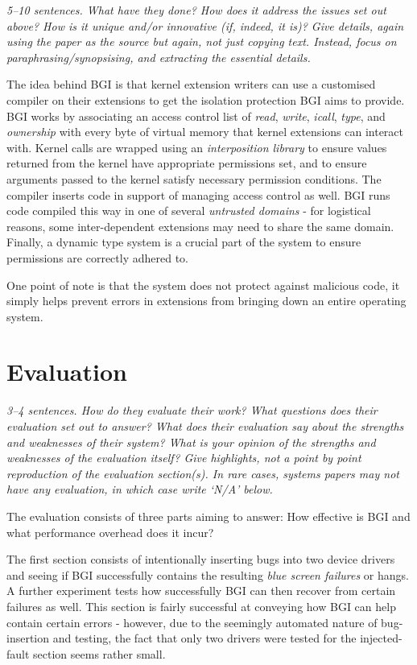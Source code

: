 \documentclass[11pt]{article}
\begin{document}
\textsl{5--10 sentences. What have they done? How does it address the issues
set out above? How is it unique and/or innovative (if, indeed, it is)? Give
details, again using the paper as the source but again, not just copying text.
Instead, focus on paraphrasing/synopsising, and extracting the essential
details.}

The idea behind BGI is that kernel extension writers can use a customised
compiler on their extensions to get the isolation protection BGI aims to
provide. BGI works by associating an access control list of \textit{read},
\textit{write}, \textit{icall}, \textit{type}, and \textit{ownership} with
every byte of virtual memory that kernel extensions can interact with. Kernel
calls are wrapped using an \textit{interposition library} to ensure values
returned from the kernel have appropriate permissions set, and to ensure
arguments passed to the kernel satisfy necessary permission conditions. The
compiler inserts code in support of managing access control as well. BGI runs
code compiled this way in one of several \textit{untrusted domains} - for
logistical reasons, some inter-dependent extensions may need to share the same
domain. Finally, a dynamic type system is a crucial part of the system to
ensure permissions are correctly adhered to.

One point of note is that the system does not protect against malicious code,
it simply helps prevent errors in extensions from bringing down an entire
operating system.

\section*{Evaluation}

\textsl{3--4 sentences. How do they evaluate their work? What questions does
their evaluation set out to answer? What does their evaluation say about the
strengths and weaknesses of their system? What is your opinion of the strengths
and weaknesses of the evaluation itself? Give highlights, not a point by point
reproduction of the evaluation section(s). In rare cases, systems papers may
not have any evaluation, in which case write `N/A' below.}

The evaluation consists of three parts aiming to answer: How effective is BGI and
what performance overhead does it incur?

The first section consists of intentionally inserting bugs into two device
drivers and seeing if BGI successfully contains the resulting \textit{blue
screen failures} or hangs. A further experiment tests how successfully BGI can
then recover from certain failures as well. This section is fairly successful
at conveying how BGI can help contain certain errors - however, due to the
seemingly automated nature of bug-insertion and testing, the fact that only two
drivers were tested for the injected-fault section seems rather small.
\end{document}
